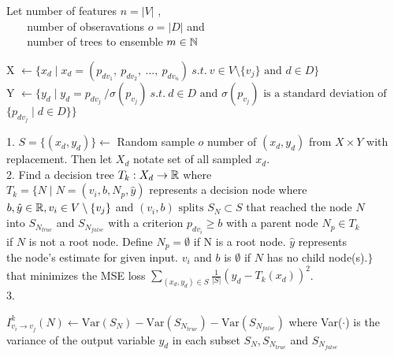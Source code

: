 \clearpage
\begin{algorithm}[H]
    \DontPrintSemicolon

    Let number of features $n = |V|$ , \\
    $\:\:\:\:\:\:\:$ number of obseravations $o = |D|$ and \\
    $\:\:\:\:\:\:\:$ number of trees to ensemble $ m \in \Bbb N$

     {
        X $\gets \{ x_d \mid x_d = (p_{dv_1},\: p_{dv_2},\: \ldots, \:p_{dv_{n}}) \: s.t. \: v \in V \setminus{\{v_j\}} \text{ and } d \in D \} \:$  \\
        Y $\gets \{ y_d  \mid y_d = p_{dv_j} \: / \sigma(p_{v_j}) \: s.t. \: d \in D \text{ and } \sigma(p_{v_j}) \text{ is a standard deviation of }$ \\
        $\{ p_{dv_j} \mid d \in D \} \}$\\

         {
            1. $S = \{(x_d, y_d)\} \gets $ Random sample $o$ number of $(x_d, y_d)$ from $X \times Y$ with replacement. Then let $X_d$ notate set of all sampled $x_d$. \\
            2. Find a decision tree $T_k: X_d \to \Bbb R$ where\\
            $T_k = \{ N \mid N = (v_i, b, N_p, \hat{y}) $ represents a decision node where \\ 
            $ b, \hat{y} \in \Bbb R, v_i \in V \setminus{\{v_j\}} $ and $(v_i, b) \text{ splits } S_N \subset S \text{ that reached the node } N $\\
            into $S_{N_{true}}$ and $S_{N_{false}}$ with a criterion $p_{dv_i} \ge b$ with a parent node $ N_p \in T_k$ \\             if $N$ is not a root node. Define $N_p = \emptyset$ if N is a root node. $\hat{y}$ represents \\
            the node's estimate for given input. $v_i$ and $b$ is $\emptyset$ if $N$ has no child node(s).$\}$\\
            that minimizes the MSE loss $\sum_{(x_d, y_d) \in S} \frac{1}{|S|}(y_d - T_k(x_d))^2$.\\
            3.
             {
                {
                    $I^k_{v_i \to v_j}(N) \gets \text{Var}(S_N) - \text{Var}(S_{N_{true}}) - \text{Var}(S_{N_{false}})$ where Var($\cdot$) is the variance
                    of the output variable $y_d$ in each subset $S_N, S_{N_{true}}$ and $S_{N_{false}}$           
                } 

}}}
\end{algorithm}
